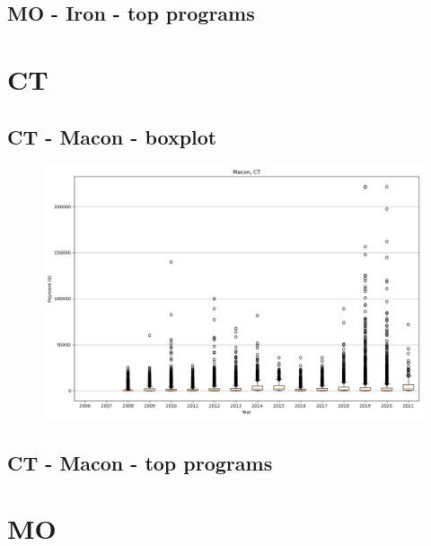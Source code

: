 \subsection*{MO - Iron - top programs}

\newpage
\section*{CT}
\subsection*{CT - Macon - boxplot}
\begin{figure}[h]
\centering
\includegraphics[width=7in]{../output/boxplots/counties/Macon-CT_boxplot.png}
\end{figure}


\subsection*{CT - Macon - top programs}

\newpage
\section*{MO}
